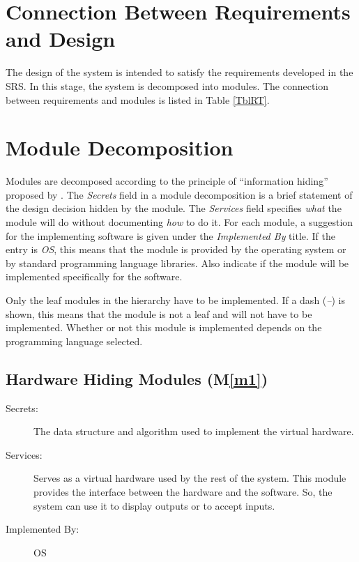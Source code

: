 \documentclass[12pt, titlepage]{article}
\newcommand{\mref}[1]{M\ref{#1}}
\begin{document}
\section{Connection Between Requirements and Design} \label{SecConnection}

The design of the system is intended to satisfy the requirements developed in
the SRS. In this stage, the system is decomposed into modules. The connection
between requirements and modules is listed in Table \ref{TblRT}.

\section{Module Decomposition} \label{SecMD}

Modules are decomposed according to the principle of ``information hiding''
proposed by \citet{ParnasEtAl1984}. The \emph{Secrets} field in a module
decomposition is a brief statement of the design decision hidden by the
module. The \emph{Services} field specifies \emph{what} the module will do
without documenting \emph{how} to do it. For each module, a suggestion for the
implementing software is given under the \emph{Implemented By} title. If the
entry is \emph{OS}, this means that the module is provided by the operating
system or by standard programming language libraries.  Also indicate if the
module will be implemented specifically for the software.

Only the leaf modules in the
hierarchy have to be implemented. If a dash (\emph{--}) is shown, this means
that the module is not a leaf and will not have to be implemented. Whether or
not this module is implemented depends on the programming language
selected.

\subsection{Hardware Hiding Modules (\mref{m1})}
\begin{description}
    \item[Secrets:] The data structure and algorithm used to implement the virtual hardware.
    \item[Services:] Serves as a virtual hardware used by the rest of the system. This module provides the interface between the hardware and the software. So, the system can use it to display outputs or to accept inputs.
    \item[Implemented By:] OS
\end{description}
\end{document}
